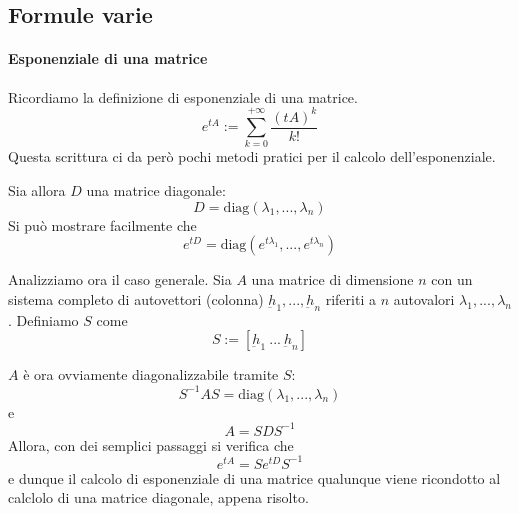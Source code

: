 \documentclass[a4paper,12pt]{article}
\begin{document}
\subsection{Formule varie}
\paragraph{Esponenziale di una matrice}
Ricordiamo la definizione di esponenziale di una matrice.
$$e^{tA} := \sum_{k=0}^{+\infty} \dfrac{(tA)^k}{k!}$$
Questa scrittura ci da però pochi metodi pratici per il calcolo dell'esponenziale.

Sia allora $D$ una matrice diagonale:
$$D=\text{diag}(\lambda_1,...,\lambda_n)$$
Si può mostrare facilmente che
$$e^{tD} = \text{diag}(e^{t\lambda_1}, ..., e^{t\lambda_n})$$

Analizziamo ora il caso generale.
Sia $A$ una matrice di dimensione $n$ con un sistema completo di autovettori (colonna) $\underbar{h}_1, ..., \underbar{h}_n$ riferiti a $n$ autovalori $\lambda_1, ..., \lambda_n$. Definiamo $S$ come
$$S:=[\underbar{h}_1\ ...\ \underbar{h}_n]$$

$A$ è ora ovviamente diagonalizzabile tramite $S$:
$$S^{-1}AS=\text{diag}(\lambda_1,...,\lambda_n)$$
e
$$A = SDS^{-1}$$
Allora, con dei semplici passaggi si verifica che
$$e^{tA} = Se^{tD}S^{-1}$$
e dunque il calcolo di esponenziale di una matrice qualunque viene ricondotto al calclolo di una matrice diagonale, appena risolto.
\end{document}
